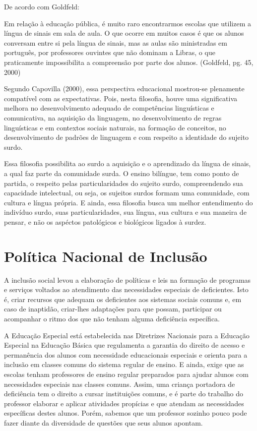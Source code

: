\documentclass[brasil]{abnt}
\begin{document}
			De acordo com Goldfeld:
			
				\begin{citacao} Em relação à educação pública, é muito raro encontrarmos escolas que utilizem a língua de sinais em sala de aula. O que ocorre em muitos casos é que os alunos conversam entre si pela língua de sinais, 
								mas as aulas são ministradas em português, por professores ouvintes que não dominam a Libras, o que praticamente impossibilita a compreensão por parte dos alunos. (Goldfeld, pg. 45, 2000)
				\end{citacao}
			
			Segundo Capovilla (2000), essa perspectiva educacional mostrou-se plenamente compatível com as expectativas. Pois, nesta filosofia, houve uma significativa melhora no desenvolvimento adequado de competências linguísticas
			e comunicativa, na aquisição da linguagem, no desenvolvimento de regras linguísticas e em contextos sociais naturais, na formação de conceitos, no desenvolvimento de padrões de linguagem e com respeito a identidade do 
			sujeito surdo.  
			
			Essa filosofia possibilita ao surdo a aquisição e o aprendizado da língua de sinais, a qual faz parte da comunidade surda. O ensino bilíngue, tem como ponto de partida, o respeito pelas particularidades do sujeito surdo,
			compreendendo sua capacidade intelectual, ou seja, os sujeitos surdos formam uma comunidade, com cultura e língua própria. E ainda, essa filosofia busca um melhor entendimento do indivíduo surdo, suas particularidades, 
			sua língua, sua cultura e sua maneira de pensar, e não os aspéctos patológicos e biológicos ligados à surdez.
			
			
\chapter{Política Nacional de Inclusão}
	A inclusão social levou a elaboração de políticas e leis na formação de programas e serviços voltados ao atendimento das necessidades especiais de deficientes. Isto é, criar recursos que 
	adequam os deficientes aos sistemas sociais comuns e, em caso de inaptidão, criar-lhes adaptações para que possam, participar ou acompanhar o ritmo dos que não tenham alguma deficiência específica. 
	
	A Educação Especial está estabelecida nas Diretrizes Nacionais para a Educação Especial na Educação Básica que regulamenta a garantia do direito de acesso e permanência dos alunos com necessidade 
	educacionais especiais e orienta para a inclusão em classes comuns do sistema regular de ensino. E ainda, exige que as escolas tenham professores de ensino regular preparados para ajudar alunos com 
	necessidades especiais nas classes comuns. Assim, uma criança portadora de deficiência tem o direito a cursar instituições comuns, e é parte do trabalho do professor elaborar e aplicar atividades 
	propícias e que atendam as necessidades específicas destes alunos. Porém, sabemos que um professor sozinho pouco pode fazer diante da diversidade de questões que seus alunos apontam. 
		
\end{document}
